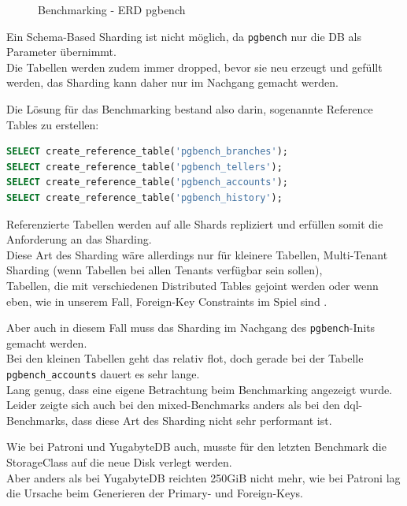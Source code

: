 \begin{flushleft}
\begin{figure}[H]
        \caption{Benchmarking - ERD pgbench}
        \label{fig:pgbench_accounts}
    \end{figure}
    Ein Schema-Based Sharding ist nicht möglich, da \texttt{pgbench} nur die DB als Parameter übernimmt.\\
    Die Tabellen werden zudem immer dropped, bevor sie neu erzeugt und gefüllt werden, das Sharding kann daher nur im Nachgang gemacht werden.\\
\end{flushleft}
\begin{flushleft}
    Die Lösung für das Benchmarking bestand also darin, sogenannte Reference Tables zu erstellen:
\lstset{style=gra_codestyle}
\begin{lstlisting}[language=sql, caption=Citus - Benchmarking - Reference Table Sharding,captionpos=b,label={lst:benchmarking_reference_table_sharding},breaklines=true]
SELECT create_reference_table('pgbench_branches');
SELECT create_reference_table('pgbench_tellers');
SELECT create_reference_table('pgbench_accounts');
SELECT create_reference_table('pgbench_history');
\end{lstlisting}
    Referenzierte Tabellen werden auf alle Shards repliziert und erfüllen somit die Anforderung an das Sharding.\\
    Diese Art des Sharding wäre allerdings nur für kleinere Tabellen, Multi-Tenant Sharding (wenn Tabellen bei allen Tenants verfügbar sein sollen),\\
    Tabellen, die mit verschiedenen Distributed Tables gejoint werden oder wenn eben, wie in unserem Fall, Foreign-Key Constraints im Spiel sind \cite{KPPLMKD4}.
\end{flushleft}
\begin{flushleft}
    Aber auch in diesem Fall muss das Sharding im Nachgang des \texttt{pgbench}-Inits gemacht werden.\\
    Bei den kleinen Tabellen geht das relativ flot, doch gerade bei der Tabelle \texttt{pgbench\_accounts} dauert es sehr lange.\\
    Lang genug, dass eine eigene Betrachtung beim Benchmarking angezeigt wurde.\\
    Leider zeigte sich auch bei den mixed-Benchmarks anders als bei den dql-Benchmarks, dass diese Art des Sharding nicht sehr performant ist.
\end{flushleft}
\begin{flushleft}
    Wie bei Patroni und YugabyteDB auch, musste für den letzten Benchmark die StorageClass auf die neue Disk verlegt werden.\\
    Aber anders als bei YugabyteDB reichten 250GiB nicht mehr, wie bei Patroni lag die Ursache beim Generieren der Primary- und Foreign-Keys.
\end{flushleft}
